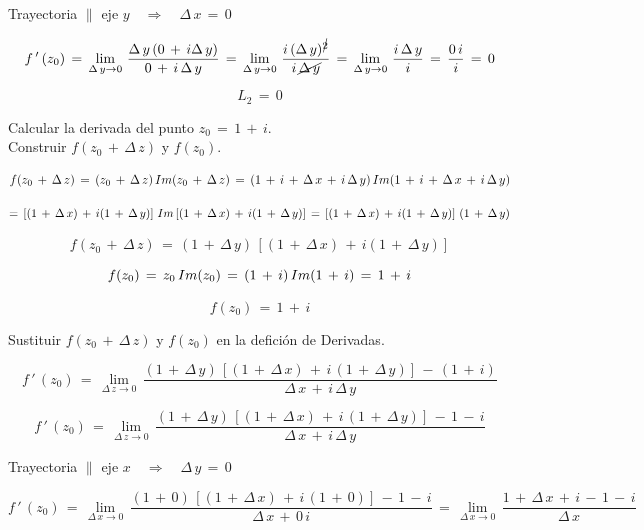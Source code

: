 \documentclass[a4paper,11pt,openany]{book}
\begin{document}
\textcolor{ao(english)}{} Trayectoria $\parallel$ eje $y \quad\Rightarrow\quad \Delta\,x\,=\,0$

$$f\,'\,(z_{0})\,=\,\displaystyle\lim_{\Delta\,y \to 0}\,\dfrac{\Delta\,y\,(0\,+\,i\Delta\,y)}{0\,+\,i\,\Delta\,y}\,=\,\displaystyle\lim_{\Delta\,y \to 0}\,\dfrac{i\,(\Delta\,y)^{\cancel{2}}}{i\,\cancel{\Delta\,y}}\,=\,\displaystyle\lim_{\Delta\,y \to 0}\,\dfrac{i\,\Delta\,y}{i}\,=\,\dfrac{0\,i}{i}\,=\,0$$

$$L_{2}\,=\,0$$

\textcolor{ao(english)}{} Calcular la derivada del punto $z_{0}\,=\,1\,+\,i$.\\

\textcolor{ao(english)}{} Construir $f(z_{0}\,+\,\Delta\,z)$ y $f(z_{0})$.

$$f(z_{0}\,+\,\Delta\,z)\,=\,(z_{0}\,+\,\Delta\,z)\,\mathnormal{Im}(z_{0}\,+\,\Delta\,z)\,=\,(1\,+\,i\,+\,\Delta\,x\,+\,i\,\Delta\,y)\,\mathnormal{Im}(1\,+\,i\,+\,\Delta\,x\,+\,i\,\Delta\,y)$$

$$=\,\left[(1\,+\,\Delta\,x)\,+\,i(1\,+\,\Delta\,y)\right]\,\mathnormal{Im}\left[(1\,+\,\Delta\,x)\,+\,i(1\,+\,\Delta\,y)\right]\,=\,\left[(1\,+\,\Delta\,x)\,+\,i(1\,+\,\Delta\,y)\right]\,(1\,+\,\Delta\,y)$$

$$f(z_{0}\,+\,\Delta\,z)\,=\,(1\,+\,\Delta\,y)\,\left[(1\,+\,\Delta\,x)\,+\,i(1\,+\,\Delta\,y)\right]$$

$$f(z_{0})\,=\,z_{0}\,\mathnormal{Im}(z_{0})\,=\,(1\,+\,i)\,\mathnormal{Im}(1\,+\,i)\,=\,1\,+\,i$$

$$f(z_{0})\,=\,1\,+\,i$$

\textcolor{ao(english)}{} Sustituir  $f(z_{0}\,+\,\Delta\,z)$ y $f(z_{0})$ en la defición de Derivadas.

$$f\,'\,(z_{0})\,=\,\displaystyle\lim_{\Delta\,z \to 0}\,\dfrac{(1\,+\,\Delta\,y)\,\left[(1\,+\,\Delta\,x)\,+\,i\,(1\,+\,\Delta\,y)\right]\,-\,(1\,+\,i)}{\Delta\,x\,+\,i\,\Delta\,y}$$

$$f\,'\,(z_{0})\,=\,\displaystyle\lim_{\Delta\,z \to 0}\,\dfrac{(1\,+\,\Delta\,y)\,\left[(1\,+\,\Delta\,x)\,+\,i\,(1\,+\,\Delta\,y)\right]\,-\,1\,-\,i}{\Delta\,x\,+\,i\,\Delta\,y}$$

\textcolor{ao(english)}{} Trayectoria $\parallel$ eje $x \quad\Rightarrow\quad \Delta\,y\,=\,0$

$$f\,'\,(z_{0})\,=\,\displaystyle\lim_{\Delta\,x \to 0}\,\dfrac{(1\,+\,0)\,\left[(1\,+\,\Delta\,x)\,+\,i\,(1\,+\,0)\right]\,-\,1\,-\,i}{\Delta\,x\,+\,0\,i}\,=\,\displaystyle\lim_{\Delta\,x \to 0}\,\dfrac{1\,+\,\Delta\,x\,+\,i\,-\,1\,-\,i}{\Delta\,x}$$
\end{document}

